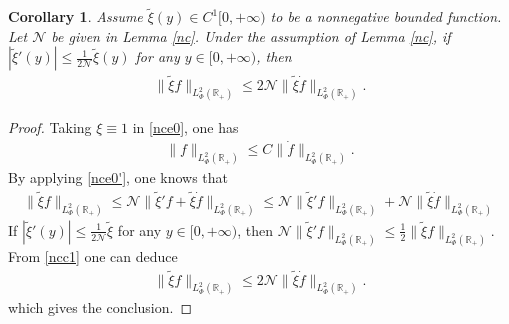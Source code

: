 \documentclass{amsart}
\numberwithin{equation}{section}
\newtheorem{corollary}{Corollary}[section]
\begin{document}
\begin{corollary}\label{ncC1}
Assume $\tilde{\xi}(y)\in C^{1}[0,+\infty)$ to be a nonnegative bounded function. Let $\mathcal{N}$ be given in Lemma \ref{nc}.
Under the assumption of Lemma \ref{nc}, if $|\tilde{\xi}'(y)|\leq \frac{1}{2\mathcal{N}}\tilde{\xi}(y)$ for any $y\in[0,+\infty)$, then
\begin{align*}
\|\tilde{\xi} f\|_{L_{\Phi}^{2}(\mathbb{R}_{+})}\leq 2\mathcal{N}\|\tilde{\xi}\dot{f}\|_{L_{\Phi}^{2}(\mathbb{R}_{+})}.
\end{align*}

\end{corollary}
\begin{proof}
Taking $\xi\equiv1$ in \eqref{nce0}, one has
\begin{align}\label{nce0'}
\|f\|_{L_{\Phi}^{2}(\mathbb{R}_{+})}\leq C\|\dot{f}\|_{L_{\Phi}^{2}(\mathbb{R}_{+})}.
\end{align}
By applying \eqref{nce0'}, one knows that
\begin{align}\label{ncc1}
\|\tilde{\xi}f\|_{L_{\Phi}^{2}(\mathbb{R}_{+})}
\leq \mathcal{N}\|\tilde{\xi}'f+\tilde{\xi}\dot{f}\|_{L_{\Phi}^{2}(\mathbb{R}_{+})}
\leq \mathcal{N}\|\tilde{\xi}'f\|_{L_{\Phi}^{2}(\mathbb{R}_{+})}
    +\mathcal{N}\|\tilde{\xi}\dot{f}\|_{L_{\Phi}^{2}(\mathbb{R}_{+})}
\end{align}
If $|\tilde{\xi}'(y)|\leq \frac{1}{2\mathcal{N}}\tilde{\xi}$ for any $y\in[0,+\infty)$, then
$\mathcal{N}\|\tilde{\xi}'f\|_{L_{\Phi}^{2}(\mathbb{R}_{+})}\leq \frac{1}{2}\|\tilde{\xi}f\|_{L_{\Phi}^{2}(\mathbb{R}_{+})}$.
From \eqref{ncc1} one can deduce
\begin{align*}
\|\tilde{\xi} f\|_{L_{\Phi}^{2}(\mathbb{R}_{+})}
\leq 2\mathcal{N}\|\tilde{\xi}\dot{f}\|_{L_{\Phi}^{2}(\mathbb{R}_{+})}.
\end{align*}
which gives the conclusion.
\end{proof}
\end{document}
